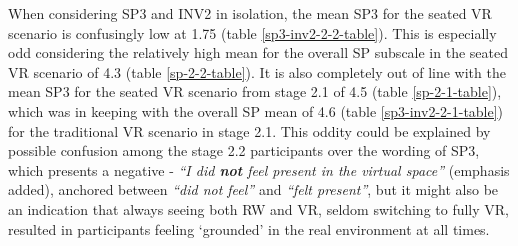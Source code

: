 When considering SP3 and INV2 in isolation, the mean SP3 for the seated VR scenario is confusingly low at 1.75 (table \ref{sp3-inv2-2-2-table}). This is especially odd considering the relatively high mean for the overall SP subscale in the seated VR scenario of 4.3 (table \ref{sp-2-2-table}). It is also completely out of line with the mean SP3 for the seated VR scenario from stage 2.1 of 4.5 (table \ref{sp-2-1-table}), which was in keeping with the overall SP mean of 4.6 (table \ref{sp3-inv2-2-1-table}) for the traditional VR scenario in stage 2.1. This oddity could be explained by possible confusion among the stage 2.2 participants over the wording of SP3, which presents a negative - \textit{``I did \textbf{not} feel present in the virtual space''} (emphasis added), anchored between \textit{``did not feel''} and \textit{``felt present''}, but it might also be an indication that always seeing both RW and VR, seldom switching to fully VR, resulted in participants feeling `grounded' in the real environment at all times.

